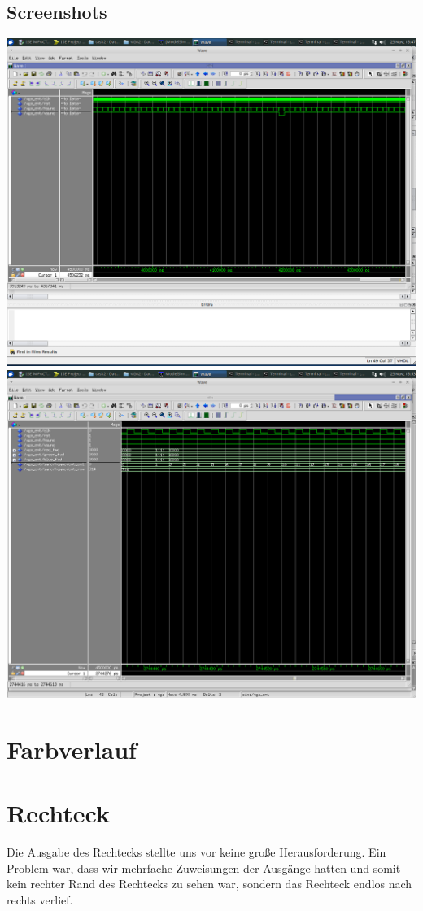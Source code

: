 \documentclass[parskip=full]{scrartcl}
\begin{document}
		\subsection{Screenshots}
			\includegraphics[scale=0.27]{Bilder/sync.png} \newline
			\includegraphics[scale=0.27]{Bilder/edge_white_rest_black.png}

	\section{Farbverlauf}
		
	\section{Rechteck}
		Die Ausgabe des Rechtecks stellte uns vor keine große Herausforderung. Ein Problem war, dass wir mehrfache Zuweisungen der Ausgänge hatten und somit kein rechter Rand des Rechtecks zu sehen war, sondern das Rechteck endlos nach rechts verlief.
	
\end{document}
